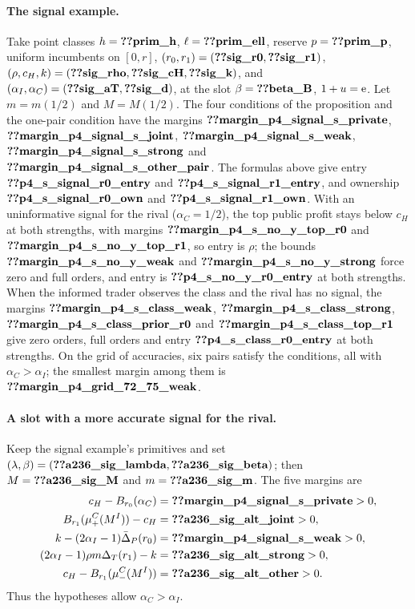\paragraph{The signal example.}
Take point classes \(h=\reg{prim_h}\), \(\ell=\reg{prim_ell}\), reserve \(p=\reg{prim_p}\), uniform incumbents on \([0,r]\),
\((r_0,r_1)=(\reg{sig_r0},\reg{sig_r1})\), \((\rho,c_H,k)=(\reg{sig_rho},\reg{sig_cH},\reg{sig_k})\),
and \((\alpha_I,\alpha_C)=(\reg{sig_aT},\reg{sig_d})\), at the slot \(\beta=\reg{beta_B}\), \(1+u=\mathrm{e}\).
Let \(m=m(1/2)\) and \(M=M(1/2)\). The four conditions of the proposition and the one-pair
condition have the margins \(\reg{margin_p4_signal_s_private}\), \(\reg{margin_p4_signal_s_joint}\),
\(\reg{margin_p4_signal_s_weak}\), \(\reg{margin_p4_signal_s_strong}\) and \(\reg{margin_p4_signal_s_other_pair}\). The
formulas above give entry \(\reg{p4_s_signal_r0_entry}\) and \(\reg{p4_s_signal_r1_entry}\), and ownership
\(\reg{p4_s_signal_r0_own}\) and \(\reg{p4_s_signal_r1_own}\). With an uninformative signal for the rival (\(\alpha_C=1/2\)), the top
public profit stays below \(c_H\) at both strengths, with margins \(\reg{margin_p4_s_no_y_top_r0}\) and
\(\reg{margin_p4_s_no_y_top_r1}\), so entry is \(\rho\); the bounds \(\reg{margin_p4_s_no_y_weak}\) and
\(\reg{margin_p4_s_no_y_strong}\) force zero and full orders, and entry is \(\reg{p4_s_no_y_r0_entry}\) at both
strengths. When the informed trader observes the class and the rival has no signal, the margins
\(\reg{margin_p4_s_class_weak}\), \(\reg{margin_p4_s_class_strong}\), \(\reg{margin_p4_s_class_prior_r0}\) and
\(\reg{margin_p4_s_class_top_r1}\) give zero orders, full orders and entry \(\reg{p4_s_class_r0_entry}\) at both
strengths. On the grid of accuracies, six pairs satisfy the conditions, all with \(\alpha_C>\alpha_I\); the smallest margin among
them is \(\reg{margin_p4_grid_72_75_weak}\).

\paragraph{A slot with a more accurate signal for the rival.}
Keep the signal example's primitives and set
\((\lambda,\beta)=(\reg{a236_sig_lambda},\reg{a236_sig_beta})\); then
\(M=\reg{a236_sig_M}\) and \(m=\reg{a236_sig_m}\). The five margins are
\[
\begin{aligned}
c_H-B_{r_0}(\alpha_C)&=\reg{margin_p4_signal_s_private}>0,\\
B_{r_1}(\mu^C_+(M^I))-c_H&=\reg{a236_sig_alt_joint}>0,\\
k-(2\alpha_I-1)\bar\Delta_P(r_0)&=\reg{margin_p4_signal_s_weak}>0,\\
(2\alpha_I-1)\rho m\DT(r_1)-k&=\reg{a236_sig_alt_strong}>0,\\
c_H-B_{r_1}(\mu^C_-(M^I))&=\reg{a236_sig_alt_other}>0.
\end{aligned}
\]
Thus the hypotheses allow \(\alpha_C>\alpha_I\).

